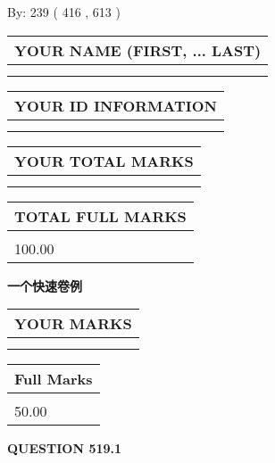 \documentclass{ctexart}
\begin{document}
   
\hspace{1.0in} By: 
 239 ( 416 ,  613 )
   
   
   
   
\newpage 
\setcounter{page}{ 
   519001 } 
   
   
   
   
\noindent\begin{tabular}{|l|}
\hline
YOUR NAME (FIRST, ... LAST)  \\
\hline
 \\ 
 \\ 
\hline
\end{tabular}
\hspace{0.05in} \begin{tabular}{|l|}
\hline
 YOUR   ID   INFORMATION  \\
\hline
 \\ 
 \\ 
\hline
\end{tabular}
   
   
\vspace{0.2in}\noindent\begin{tabular}{|l|}
\hline
YOUR TOTAL MARKS  \\
\hline
 \\ 
 \\ 
\hline
\end{tabular}
\hspace{0.05in} \begin{tabular}{|l|}
\hline
TOTAL FULL MARKS  \\
\hline
 \\ 
100.00 \\
\hline
\end{tabular}
   
   
 \vspace{0.2in}
{\LARGE {\textbf{ 一个快速卷例}}}
   
   
  
\vspace{0.2in}
  
\noindent\begin{tabular}{|l|}
\hline
 YOUR MARKS  \\
\hline
 \\ 
 \\ 
\hline
\end{tabular}
\hspace{0.05in} \begin{tabular}{|l|}
\hline
 Full Marks  \\
\hline
 \\ 
50.00 \\
\hline
\end{tabular}
{\textbf{\Large{QUESTION
519.1 
}}}
  
\end{document}
